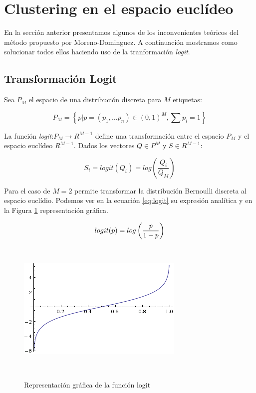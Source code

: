 \section{Clustering en el espacio eucl\'ideo}

En la secci\'on anterior presentamos algunos de los inconvenientes te\'oricos 
del m\'etodo propuesto por Moreno-Dominguez. A continuaci\'on mostramos como 
solucionar todos ellos haciendo uso de la tranformaci\'on \textit{logit}. \\

\subsection{Transformaci\'on Logit}
\label{sec:logit}

Sea $P_M$ el espacio de una distribuci\'on discreta para $M$ etiquetas: 

$$P_M = \left\{  p | p = (p_1,\dots p_n) \in (0,1)^M , \sum{p_i} = 1 \right\}$$

La funci\'on \textit{logit}:$P_M \rightarrow R^{M-1}$ define una transformaci\'on
entre el espacio $P_M$ y el espacio eucl\'ideo $R^{M-1}$. Dados los vectores $Q \in P^M$ y
$S \in R^{M-1}$:

$$S_i = logit(Q_i) = log\left(\frac{Q_i}{Q_M}\right)$$

Para el caso de $M=2$ permite transformar la distribuci\'on Bernoulli
discreta al espacio eucl\'idio. Podemos ver en la ecuaci\'on \ref{eq:logit} su
expresi\'on anal\'itica y en la Figura \ref{fig:dominio} representaci\'on 
gr\'afica.

\begin{figure}[h!]

\begin{minipage}[b]{0.45\textwidth}

    \begin{equation}
    \vspace{2.85cm}
        \label{eq:logit}
    logit(p) = log\left(\frac{p}{1-p}\right)
    \end{equation}
\end{minipage} ~
\hfill
\begin{minipage}[b]{0.45\textwidth}
    \includegraphics[width=\textwidth]{img/logit.png}
    \caption{Representaci\'on gr\'afica de la funci\'on logit}
    \label{fig:dominio}
\end{minipage} ~

\end{figure}  

